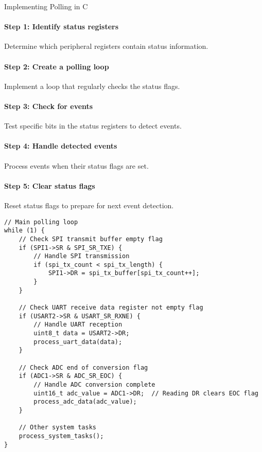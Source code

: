 \begin{KR}{Implementing Polling in C}\\
\paragraph{Step 1: Identify status registers}
Determine which peripheral registers contain status information.
\paragraph{Step 2: Create a polling loop}
Implement a loop that regularly checks the status flags.
\paragraph{Step 3: Check for events}
Test specific bits in the status registers to detect events.
\paragraph{Step 4: Handle detected events}
Process events when their status flags are set.
\paragraph{Step 5: Clear status flags}
Reset status flags to prepare for next event detection.

\begin{lstlisting}[style=basesmol]
// Main polling loop
while (1) {
    // Check SPI transmit buffer empty flag
    if (SPI1->SR & SPI_SR_TXE) {
        // Handle SPI transmission
        if (spi_tx_count < spi_tx_length) {
            SPI1->DR = spi_tx_buffer[spi_tx_count++];
        }
    }
    
    // Check UART receive data register not empty flag
    if (USART2->SR & USART_SR_RXNE) {
        // Handle UART reception
        uint8_t data = USART2->DR;
        process_uart_data(data);
    }
    
    // Check ADC end of conversion flag
    if (ADC1->SR & ADC_SR_EOC) {
        // Handle ADC conversion complete
        uint16_t adc_value = ADC1->DR;  // Reading DR clears EOC flag
        process_adc_data(adc_value);
    }
    
    // Other system tasks
    process_system_tasks();
}
\end{lstlisting}
\end{KR}

